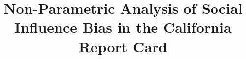 \documentclass{acm_proc_article-sp}
\begin{document}
\title{Non-Parametric Analysis of Social Influence Bias in the California Report Card}

%
%
%
%
%


%

\end{document}
